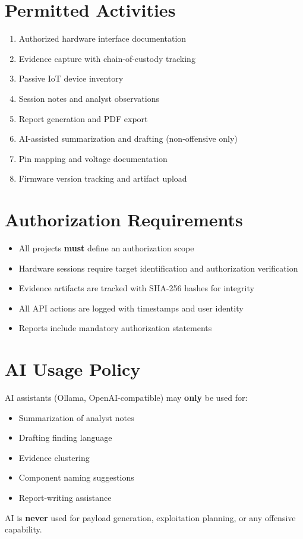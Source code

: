 \documentclass[11pt,a4paper]{article}
\begin{document}
\section{Permitted Activities}
\begin{enumerate}[label=\textcolor{cyber}{\arabic*.}]
  \item Authorized hardware interface documentation
  \item Evidence capture with chain-of-custody tracking
  \item Passive IoT device inventory
  \item Session notes and analyst observations
  \item Report generation and PDF export
  \item AI-assisted summarization and drafting (non-offensive only)
  \item Pin mapping and voltage documentation
  \item Firmware version tracking and artifact upload
\end{enumerate}

\section{Authorization Requirements}
\begin{itemize}
  \item All projects \textbf{must} define an authorization scope
  \item Hardware sessions require target identification and authorization verification
  \item Evidence artifacts are tracked with SHA-256 hashes for integrity
  \item All API actions are logged with timestamps and user identity
  \item Reports include mandatory authorization statements
\end{itemize}

\section{AI Usage Policy}
AI assistants (Ollama, OpenAI-compatible) may \textbf{only} be used for:
\begin{itemize}
  \item Summarization of analyst notes
  \item Drafting finding language
  \item Evidence clustering
  \item Component naming suggestions
  \item Report-writing assistance
\end{itemize}
AI is \textbf{never} used for payload generation, exploitation planning, or
any offensive capability.
\end{document}
